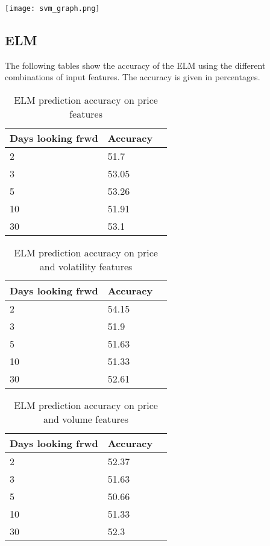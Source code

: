 \documentclass{article}
\begin{document}
\texttt{[image: svm\_graph.png]}

\newpage
\subsection{ELM}
The following tables show the accuracy of the ELM using the different combinations of input features. The accuracy is given in percentages.
\begin{table}[!h]
\begin{center}
    \begin{tabular}{ | l | l | p{3cm} |}
    \hline
    Days looking frwd & Accuracy \\ \hline
    2 &  51.7 \\ \hline
    3 & 53.05  \\ \hline
    5 & 53.26  \\ \hline
    10 & 51.91  \\ \hline
    30 & 53.1 \\ 
    \hline
    \end{tabular}
\caption{ELM prediction accuracy on price features}
\end{center}
\end{table}

\begin{table}[!h]
\begin{center}
    \begin{tabular}{ | l | l | p{3cm} |}
    \hline
    Days looking frwd & Accuracy \\ \hline
    2 & 54.15  \\ \hline
    3 & 51.9  \\ \hline
    5 & 51.63  \\ \hline
    10 & 51.33  \\ \hline
    30 & 52.61 \\ 
    \hline
    \end{tabular}
\caption{ELM prediction accuracy on price and volatility features}
\end{center}
\end{table}

\begin{table}[h]
\begin{center}
    \begin{tabular}{ | l | l | p{3cm} |}
    \hline
    Days looking frwd & Accuracy \\ \hline
    2 & 52.37  \\ \hline
    3 & 51.63  \\ \hline
    5 & 50.66  \\ \hline
    10 & 51.33  \\ \hline
    30 & 52.3 \\ 
    \hline
    \end{tabular}
\caption{ELM prediction accuracy on price and volume features}
\end{center}
\end{table}
\end{document}
